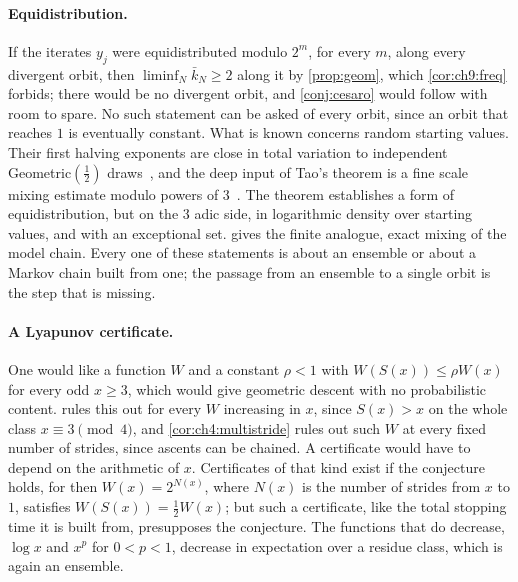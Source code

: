 \paragraph{Equidistribution.} If the iterates $y_j$ were equidistributed modulo $2^m$, for every $m$, along every divergent orbit, then $\liminf_N\bar k_N\ge2$ along it by \cref{prop:geom}, which \cref{cor:ch9:freq} forbids; there would be no divergent orbit, and \cref{conj:cesaro} would follow with room to spare.
No such statement can be asked of every orbit, since an orbit that reaches $1$ is eventually constant.
What is known concerns random starting values. Their first halving exponents are close in total variation to independent Geometric$(\tfrac12)$ draws~\cite[Proposition~1.9]{tao2022}, and the deep input of Tao's theorem is a fine scale mixing estimate modulo powers of $3$~\cite[Proposition~1.14]{tao2022}.
The theorem establishes a form of equidistribution, but on the $3$ adic side,
in logarithmic density over starting values, and with an exceptional set.
 gives the finite analogue,
exact mixing of the model chain. Every one of these statements is about an
ensemble or about a Markov chain built from one; the passage from an ensemble
to a single orbit is the step that is missing.

\paragraph{A Lyapunov certificate.} One would like a function $W$ and a constant
$\rho<1$ with $W(S(x))\le\rho W(x)$ for every odd $x\geq3$, which would give
geometric descent with no probabilistic content.  rules
this out for every $W$ increasing in $x$, since $S(x)>x$ on the whole class
$x\equiv3\pmod4$, and \cref{cor:ch4:multistride} rules out such $W$ at every fixed number
of strides, since ascents can be chained. A certificate would have to depend on
the arithmetic of $x$. Certificates of that kind exist if the conjecture holds, for then $W(x)=2^{N(x)}$, where $N(x)$ is the number of strides from $x$ to $1$, satisfies $W(S(x))=\tfrac12W(x)$; but such a certificate, like the total stopping time it is built from, presupposes the conjecture. The functions that
do decrease, $\log x$ and $x^p$ for $0<p<1$, decrease in expectation
over a residue class, which is again an ensemble.

